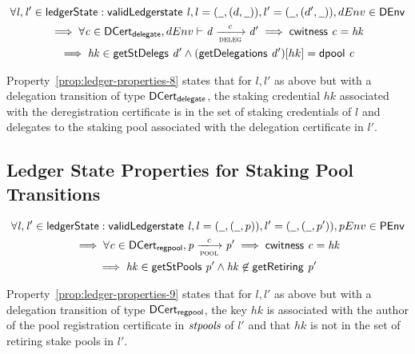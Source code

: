 \begin{property}
  \begin{multline*}
    \forall \var{l}, \var{l'} \in \ledgerState: \applyFun{validLedgerstate}{l},
    l = (\wcard, (d,\wcard)), l' = (\wcard, (d',\wcard)), dEnv\in\DEnv \\
    \implies \forall \var{c} \in \DCertDeleg, dEnv \vdash\var{d}
    \trans{deleg}{c} \var{d'} \implies \applyFun{cwitness}{c} = \var{hk}\\
    \implies \var{hk} \in \applyFun{getStDelegs}{d'} \wedge
    (\applyFun{getDelegations}{d'})[hk] = \applyFun{dpool}{c}
  \end{multline*}
  \label{prop:ledger-properties-8}
\end{property}

Property~\ref{prop:ledger-properties-8} states that for $l, l'$ as above but
with a delegation transition of type $\mathsf{DCert_{delegate}}$, the staking credential $hk$
associated with the deregistration certificate is in the set of staking
credentials of $l$ and delegates to the staking pool associated with the
delegation certificate in $l'$.

\subsection{Ledger State Properties for Staking Pool Transitions}
\label{sec:ledg-state-prop}

\begin{property}
  \begin{multline*}
    \forall \var{l}, \var{l'} \in \ledgerState: \applyFun{validLedgerstate}{l},
    l = (\wcard, (\wcard, p)), l' = (\wcard, (\wcard, p')), pEnv\in\PEnv \\
    \implies \forall \var{c} \in \DCertRegPool, \var{p} \trans{pool}{c} \var{p'}
    \implies \applyFun{cwitness}{c} = \var{hk}\\ \implies
    \var{hk}\in\applyFun{getStPools}{p'} \wedge \var{hk} \not\in
    \applyFun{getRetiring}{p'}
  \end{multline*}
  \label{prop:ledger-properties-9}
\end{property}

Property~\ref{prop:ledger-properties-9} states that for $l, l'$ as above but
with a delegation transition of type $\mathsf{DCert_{regpool}}$, the key $hk$ is associated
with the author of the pool registration certificate in $\mathit{stpools}$ of $l'$
and that $hk$ is not in the set of retiring stake pools in $l'$.

